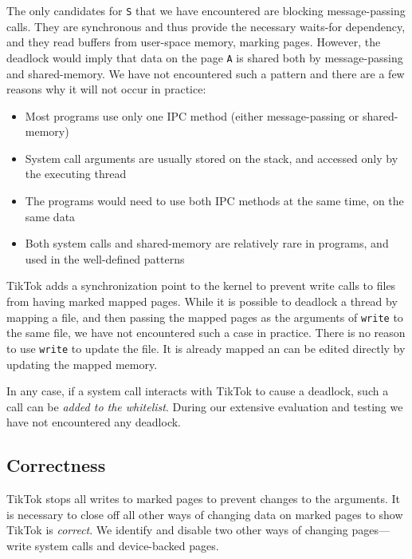 \documentclass[conference]{IEEEtran}
\newcommand{\sysname}{TikTok}
\begin{document}
The only candidates for \texttt{S} that we have encountered are blocking
message-passing calls. They are synchronous and thus provide the necessary
waits-for dependency, and they read buffers from user-space memory, marking
pages. However, the deadlock would imply that data on the page \texttt{A} is
shared both by message-passing and shared-memory. We have not encountered such a
pattern and there are a few reasons why it will not occur in practice:

\begin{itemize}
  \item Most programs use only one IPC method (either message-passing or
  shared-memory)
  \item System call arguments are usually stored on the stack, and accessed only
  by the executing thread
  \item The programs would need to use both IPC methods at the same time, on the
  same data
  \item Both system calls and shared-memory are relatively rare in programs, and
  used in the well-defined patterns
\end{itemize}

\sysname{} adds a synchronization point to the kernel to prevent write calls to
files from having marked mapped pages. While it is possible to deadlock a thread
by mapping a file, and then passing the mapped pages as the arguments of
\texttt{write} to the same file, we have not encountered such a case in
practice. There is no reason to use \texttt{write} to update the file. It is
already mapped an can be edited directly by updating the mapped memory.

In any case, if a system call interacts with \sysname{} to cause a deadlock,
such a call can be \emph{added to the whitelist}. During our extensive
evaluation and testing we have not encountered any deadlock.


\subsection{Correctness} \label{subsec:correctness}

\sysname{} stops all writes to marked pages to prevent changes to the arguments.
It is necessary to close off all other ways of changing data on marked pages to
show \sysname{} is \emph{correct}. We identify and disable two other ways of
changing pages---write system calls and device-backed pages.
\end{document}
